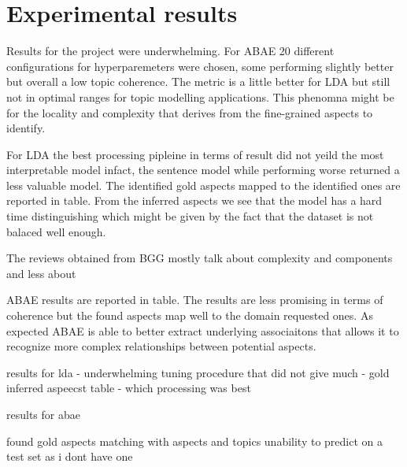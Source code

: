 \section{Experimental results}
Results for the project were underwhelming.
For ABAE 20 different configurations for hyperparemeters were chosen, some performing slightly better
but overall a low topic coherence.
The metric is a little better for LDA but still not in optimal ranges for topic modelling applications.
This phenomna might be for the locality and complexity that derives from the fine-grained aspects to identify.

For LDA the best processing pipleine in terms of result did not yeild the most interpretable model infact,
the sentence model while performing worse returned a less valuable model.
The identified gold aspects mapped to the identified ones are reported in table.
From the inferred aspects we see that the model has a hard time distinguishing %
which might be given by the fact that the dataset is not balaced well enough.

The reviews obtained from BGG mostly talk about complexity and components and less about %

ABAE results are reported in table.
The results are less promising in terms of coherence but the found aspects map well to the domain requested
ones.
As expected ABAE is able to better extract underlying associaitons that allows it to recognize more complex relationships
between potential aspects.


results for lda
- underwhelming tuning procedure that did not give much
- gold inferred aspeecst table
- which processing was best

results for abae

found gold aspects matching with aspects and topics
unability to predict on a test set as i dont have one